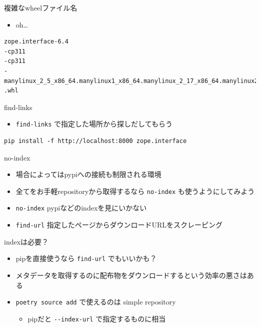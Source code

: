 \documentclass[presentation]{beamer}
\begin{document}
\begin{frame}[label={sec:orgaa46de9},fragile]{複雑なwheelファイル名}
 \begin{itemize}
\item oh\ldots{}
\end{itemize}
\begin{verbatim}
zope.interface-6.4
-cp311
-cp311
-manylinux_2_5_x86_64.manylinux1_x86_64.manylinux_2_17_x86_64.manylinux2014_x86_64
.whl
\end{verbatim}
\end{frame}
\begin{frame}[label={sec:org80872fa},fragile]{find-links}
 \begin{itemize}
\item \texttt{find-links} で指定した場所から探しだしてもらう
\end{itemize}
\begin{verbatim}
pip install -f http://localhost:8000 zope.interface
\end{verbatim}
\end{frame}

\begin{frame}[label={sec:orge292efb},fragile]{no-index}
 \begin{itemize}
\item 場合によってはpypiへの接続も制限される環境
\item 全てをお手軽repositoryから取得するなら \texttt{no-index} も使うようにしてみよう

\item \texttt{no-index} pypiなどのindexを見にいかない
\item \texttt{find-url} 指定したページからダウンロードURLをスクレーピング
\end{itemize}
\end{frame}

\begin{frame}[label={sec:orgcb3df24},fragile]{indexは必要？}
 \begin{itemize}
\item pipを直接使うなら \texttt{find-url} でもいいかも？
\item メタデータを取得するのに配布物をダウンロードするという効率の悪さはある
\item \texttt{poetry source add} で使えるのは simple repository
\begin{itemize}
\item pipだと \texttt{-{}-{}index-url} で指定するものに相当
\end{itemize}
\end{itemize}
\end{frame}
\end{document}
